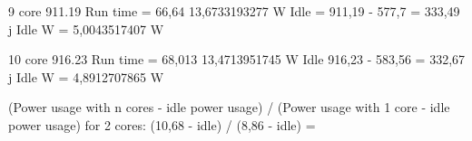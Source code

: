 9 core 911.19
Run time = 66,64
13,6733193277 W
Idle = 911,19 - 577,7 = 333,49 j
Idle W = 5,0043517407 W

10 core 916.23
Run time = 68,013
13,4713951745 W
Idle 916,23 - 583,56 = 332,67 j 
Idle W = 4,8912707865 W

(Power usage with n cores - idle power usage) / (Power usage with 1 core - idle power usage)
for 2 cores: (10,68 - idle) / (8,86 - idle) =
























